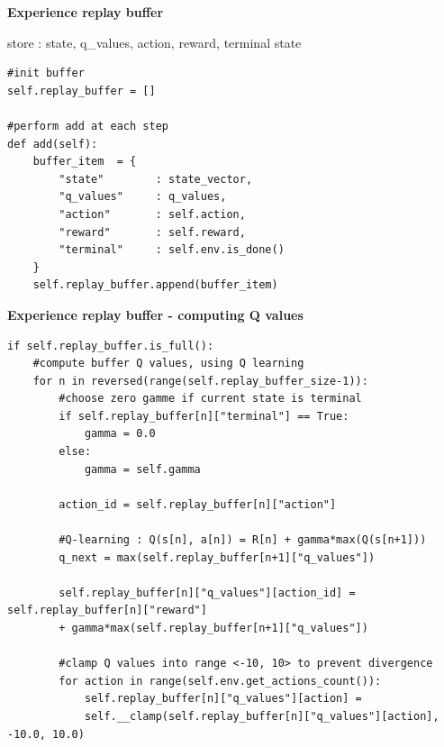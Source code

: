 \documentclass[xcolor=dvipsnames]{beamer}
\begin{document}
\begin{frame}[fragile]
{\bf Experience replay buffer}

store : state, q\_values, action, reward, terminal state

\begin{lstlisting}
#init buffer
self.replay_buffer = []

#perform add at each step
def add(self):
    buffer_item  = {
        "state"        : state_vector,
        "q_values"     : q_values,
        "action"       : self.action,
        "reward"       : self.reward,
        "terminal"     : self.env.is_done()
    }
    self.replay_buffer.append(buffer_item)
\end{lstlisting}

\end{frame}




\begin{frame}[fragile]
{\bf Experience replay buffer - computing Q values}

\begin{lstlisting}
if self.replay_buffer.is_full():
    #compute buffer Q values, using Q learning
    for n in reversed(range(self.replay_buffer_size-1)):
        #choose zero gamme if current state is terminal
        if self.replay_buffer[n]["terminal"] == True:
            gamma = 0.0
        else:
            gamma = self.gamma

        action_id = self.replay_buffer[n]["action"]

        #Q-learning : Q(s[n], a[n]) = R[n] + gamma*max(Q(s[n+1]))
        q_next = max(self.replay_buffer[n+1]["q_values"])

        self.replay_buffer[n]["q_values"][action_id] = self.replay_buffer[n]["reward"]
        + gamma*max(self.replay_buffer[n+1]["q_values"])

        #clamp Q values into range <-10, 10> to prevent divergence
        for action in range(self.env.get_actions_count()):
            self.replay_buffer[n]["q_values"][action] =
            self.__clamp(self.replay_buffer[n]["q_values"][action], -10.0, 10.0)
\end{lstlisting}


\end{frame}
\end{document}

